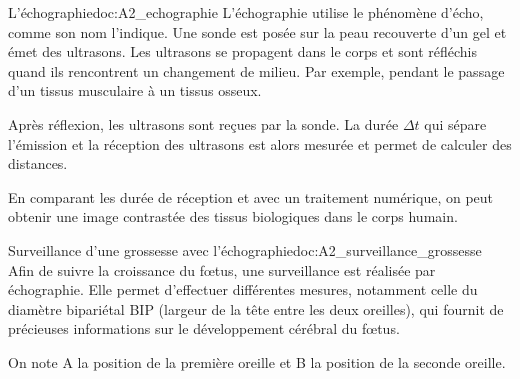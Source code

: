 \begin{doc}{L'échographie}{doc:A2_echographie}
  L'échographie utilise le phénomène d'écho, comme son nom l'indique.
  Une sonde est posée sur la peau recouverte d'un gel et émet des ultrasons.
  Les ultrasons se propagent dans le corps et sont réfléchis quand ils rencontrent un changement de milieu.
  Par exemple, pendant le passage d'un tissus musculaire à un tissus osseux.

  Après réflexion, les ultrasons sont reçues par la sonde.
  La durée $\Delta t$ qui sépare l'émission et la réception des ultrasons est alors mesurée et permet de calculer des distances.

  En comparant les durée de réception et avec un traitement numérique, on peut obtenir une image contrastée des tissus biologiques dans le corps humain.

\end{doc}

\begin{doc}{Surveillance d'une grossesse avec l'échographie}{doc:A2_surveillance_grossesse}
  Afin de suivre la croissance du fœtus, une surveillance est réalisée par échographie.
  Elle permet d’effectuer différentes mesures, notamment celle du diamètre bipariétal BIP
  (largeur de la tête entre les deux oreilles),
  qui fournit de précieuses informations sur le développement cérébral du fœtus.
  
  On note A la position de la première oreille et B la position de la seconde oreille.
\end{doc}





